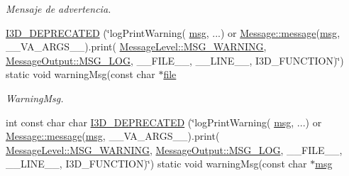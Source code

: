 \begin{DoxyCompactItemize}
\begin{DoxyCompactList}\small\item\em Mensaje de advertencia. \end{DoxyCompactList}\item 
\hyperlink{class_i3_d_1_1_log_msg_ab1a5c89d91dadcb74e6af6928957ca59}{I3\+D\+\_\+\+D\+E\+P\+R\+E\+C\+A\+T\+ED} (\char`\"{}log\+Print\+Warning( \hyperlink{class_i3_d_1_1_log_msg_a5a1ceb27d9529de8eb9b3fc9377e178a}{msg}, ...) or \hyperlink{class_i3_d_1_1_message_a525f877a41a1e7493188b2b720d1d254}{Message\+::message}(\hyperlink{class_i3_d_1_1_log_msg_a5a1ceb27d9529de8eb9b3fc9377e178a}{msg}, \+\_\+\+\_\+\+V\+A\+\_\+\+A\+R\+G\+S\+\_\+\+\_\+).print( \hyperlink{namespace_i3_d_a994cd716e000a4023e180dcdb9b3a9c0a124799373c019c5c7480f21a24104688}{Message\+Level\+::\+M\+S\+G\+\_\+\+W\+A\+R\+N\+I\+NG}, \hyperlink{namespace_i3_d_accba1eafa248ca79da818a0b72e60964a8c1a4761ebfadb227927517230ff7b02}{Message\+Output\+::\+M\+S\+G\+\_\+\+L\+OG}, \+\_\+\+\_\+\+F\+I\+L\+E\+\_\+\+\_\+, \+\_\+\+\_\+\+L\+I\+N\+E\+\_\+\+\_\+, I3\+D\+\_\+\+F\+U\+N\+C\+T\+I\+ON)\char`\"{}) static void warning\+Msg(const char $\ast$\hyperlink{class_i3_d_1_1_log_msg_ab59f20d39ef112d2196371ae0636d77c}{file}
\begin{DoxyCompactList}\small\item\em Warning\+Msg. \end{DoxyCompactList}\item 
int const char char \hyperlink{class_i3_d_1_1_log_msg_ab787c621ae0393e9fd5bdec3b2ebc02c}{I3\+D\+\_\+\+D\+E\+P\+R\+E\+C\+A\+T\+ED} (\char`\"{}log\+Print\+Warning( \hyperlink{class_i3_d_1_1_log_msg_a5a1ceb27d9529de8eb9b3fc9377e178a}{msg}, ...) or \hyperlink{class_i3_d_1_1_message_a525f877a41a1e7493188b2b720d1d254}{Message\+::message}(\hyperlink{class_i3_d_1_1_log_msg_a5a1ceb27d9529de8eb9b3fc9377e178a}{msg}, \+\_\+\+\_\+\+V\+A\+\_\+\+A\+R\+G\+S\+\_\+\+\_\+).print( \hyperlink{namespace_i3_d_a994cd716e000a4023e180dcdb9b3a9c0a124799373c019c5c7480f21a24104688}{Message\+Level\+::\+M\+S\+G\+\_\+\+W\+A\+R\+N\+I\+NG}, \hyperlink{namespace_i3_d_accba1eafa248ca79da818a0b72e60964a8c1a4761ebfadb227927517230ff7b02}{Message\+Output\+::\+M\+S\+G\+\_\+\+L\+OG}, \+\_\+\+\_\+\+F\+I\+L\+E\+\_\+\+\_\+, \+\_\+\+\_\+\+L\+I\+N\+E\+\_\+\+\_\+, I3\+D\+\_\+\+F\+U\+N\+C\+T\+I\+ON)\char`\"{}) static void warning\+Msg(const char $\ast$\hyperlink{class_i3_d_1_1_log_msg_a5a1ceb27d9529de8eb9b3fc9377e178a}{msg}
\item 

\end{DoxyCompactItemize}

